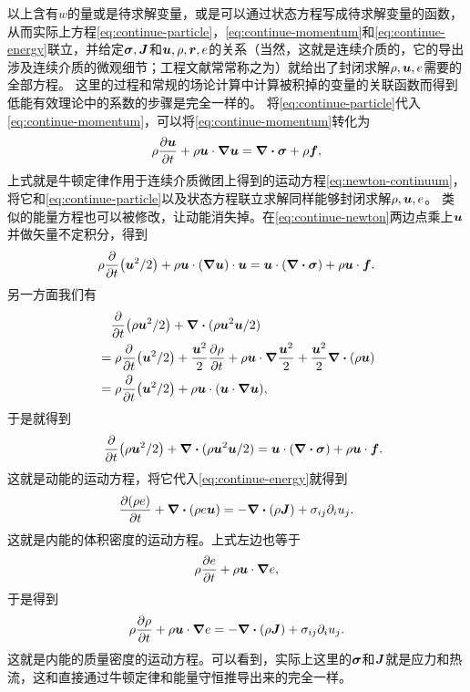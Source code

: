 以上含有$w$的量或是待求解变量，或是可以通过状态方程写成待求解变量的函数，从而实际上方程\eqref{eq:continue-particle}，\eqref{eq:continue-momentum}和\eqref{eq:continue-energy}联立，并给定$\vb*{\sigma}, \vb*{J}$和$\vb*{u}, \rho, \vb*{r}, e$的关系（当然，这就是连续介质的，它的导出涉及连续介质的微观细节；工程文献常常称之为）就给出了封闭求解$\rho, \vb*{u}, e$需要的全部方程。
这里的过程和常规的场论计算中计算被积掉的变量的关联函数而得到低能有效理论中的系数的步骤是完全一样的。
将\eqref{eq:continue-particle}代入\eqref{eq:continue-momentum}，可以将\eqref{eq:continue-momentum}转化为
\begin{equation}
    \rho \pdv{\vb*{u}}{t} + \rho \vb*{u} \cdot \grad{\vb*{u}} = \div{\vb*{\sigma}} + \rho \vb*{f},
    \label{eq:continue-newton}
\end{equation}
上式就是牛顿定律作用于连续介质微团上得到的运动方程\eqref{eq:newton-continuum}，将它和\eqref{eq:continue-particle}以及状态方程联立求解同样能够封闭求解$\rho, \vb*{u}, e$。
类似的能量方程也可以被修改，让动能消失掉。在\eqref{eq:continue-newton}两边点乘上$\vb*{u}$并做矢量不定积分，得到
\[
    \rho \pdv{t}(\vb*{u}^2 / 2) + \rho \vb*{u} \cdot (\grad{\vb*{u}}) \cdot \vb*{u} = \vb*{u} \cdot (\div{\vb*{\sigma}}) + \rho \vb*{u} \cdot \vb*{f}.
\]
另一方面我们有
\[
    \begin{aligned}
        &\quad \pdv{t} (\rho \vb*{u}^2 / 2) + \div{(\rho \vb*{u}^2 \vb*{u} / 2)} \\
        &= \rho \pdv{t}(\vb*{u}^2 / 2) + \frac{\vb*{u}^2}{2} \pdv{\rho}{t} + \rho \vb*{u} \cdot \grad \frac{\vb*{u}^2}{2} + \frac{\vb*{u}^2}{2} \div{(\rho \vb*{u})} \\
        &= \rho \pdv{t}(\vb*{u}^2 / 2) + \rho \vb*{u} \cdot (\vb*{u} \cdot \grad \vb*{u}),
    \end{aligned}
\]
于是就得到
\begin{equation}
    \quad \pdv{t} (\rho \vb*{u}^2 / 2) + \div{(\rho \vb*{u}^2 \vb*{u} / 2)} = \vb*{u} \cdot (\div{\vb*{\sigma}}) + \rho \vb*{u} \cdot \vb*{f}.
\end{equation}
这就是动能的运动方程，将它代入\eqref{eq:continue-energy}就得到
\begin{equation}
    \pdv{(\rho e)}{t} + \div{(\rho e \vb*{u})} = - \div(\rho \vb*{J}) + \sigma_{ij} \partial_i u_j.
    \label{eq:continue-internal-energy}
\end{equation}
这就是内能的体积密度的运动方程。上式左边也等于
\[
    \rho \pdv{e}{t} + \rho \vb*{u} \cdot \grad e,
\]
于是得到
\begin{equation}
    \rho \pdv{\rho}{t} + \rho \vb*{u} \cdot \grad e = - \div(\rho \vb*{J}) + \sigma_{ij} \partial_i u_j.
\end{equation}
这就是内能的质量密度的运动方程。可以看到，实际上这里的$\vb*{\sigma}$和$\vb*{J}$就是应力和热流，这和直接通过牛顿定律和能量守恒推导出来的完全一样。

